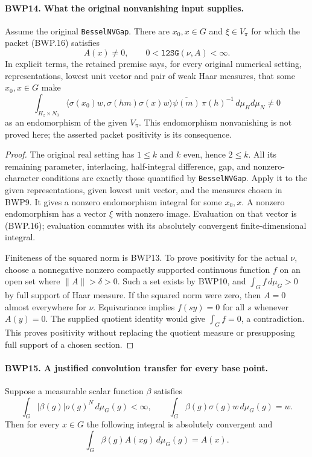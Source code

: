 \documentclass[11pt,a4paper]{article}
\numberwithin{equation}{section}
\theoremstyle{remark}\newtheorem{remark}[theorem]{Remark}
\begin{document}
\paragraph{BWP14. What the original nonvanishing input supplies.}
\label{claim:BWP14}
Assume the original \texttt{Bessel\allowbreak NVGap}.  There are
\(x_0,x\in G\) and \(\xi\in V_\pi\) for which the packet
(BWP.16) satisfies
\[
 A(x)\ne0,\qquad 0<\texttt{l2SG}(\nu,A)<\infty.
 \tag{BWP.21}
\]
In explicit terms, the retained premise says, for every original
numerical setting, representations, lowest unit vector and pair of
weak Haar measures, that some \(x_0,x\in G\) make
\[
 \int_{H_z\times N_0}
 \langle\sigma(x_0)w,\sigma(hm)\sigma(x)w\rangle
 \overline{\psi(m)}\,\pi(h)^{-1}\,d\mu_Hd\mu_N\ne0
 \tag{BWP.30}
\]
as an endomorphism of the given \(V_\pi\).  This endomorphism
nonvanishing is not proved here; the asserted packet positivity is
its consequence.

\begin{proof}
The original real setting has \(1\le k\) and \(k\) even,
hence \(2\le k\).  All its remaining parameter, interlacing,
half-integral difference, gap, and nonzero-character conditions are
exactly those quantified by \texttt{Bessel\allowbreak NVGap}.  Apply it to the
given representations, given lowest unit vector, and the measures
chosen in BWP9.  It gives a nonzero endomorphism integral for some
\(x_0,x\).  A nonzero endomorphism has a vector \(\xi\) with
nonzero image.  Evaluation on that vector is (BWP.16); evaluation
commutes with its absolutely convergent finite-dimensional integral.

Finiteness of the squared norm is BWP13.  To prove positivity for the
actual \(\nu\), choose a nonnegative nonzero compactly supported
continuous function \(f\) on an open set where \(\|A\|>\delta>0\).
Such a set exists by BWP10, and \(\int_G f\,d\mu_G>0\)
by full support of Haar measure.  If the squared norm were zero,
then \(A=0\) almost everywhere for \(\nu\).  Equivariance
implies \(f(sy)=0\) for all \(s\) whenever \(A(y)=0\).
The supplied quotient identity would give \(\int_G f=0\), a
contradiction.  This proves positivity without replacing the quotient
measure or presupposing full support of a chosen section.
\end{proof}

\paragraph{BWP15. A justified convolution transfer for every base point.}
\label{claim:BWP15}
Suppose a measurable scalar function \(\beta\) satisfies
\[
 \int_G|\beta(g)|o(g)^N\,d\mu_G(g)<\infty,
 \qquad \int_G\beta(g)\sigma(g)w\,d\mu_G(g)=w.
 \tag{BWP.22}
\]
Then for every \(x\in G\) the following integral is absolutely
convergent and
\[
 \int_G\beta(g)A(xg)\,d\mu_G(g)=A(x).
 \tag{BWP.23}
\]
\end{document}
